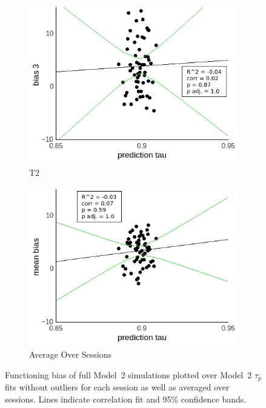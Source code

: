 \documentclass[a4paper]{scrreprt}
\begin{document}
\begin{figure}
\begin{subfigure}[b]{0.49\textwidth}
        \includegraphics[width=\textwidth]{figs/sec3/pred/predno_diff_3_mod2mod2.jpeg}
        \caption{T2}
    \end{subfigure}
    \begin{subfigure}[b]{0.49\textwidth}
        \includegraphics[width=\textwidth]{figs/sec3/pred/predno_diff_mean_mod2mod2.jpeg}
        \caption{Average Over Sessions}
    \end{subfigure}
\caption{Functioning bias of full Model~2 simulations plotted over Model~2 $\tau_p$ fits without outliers for each session as well as averaged over sessions. Lines indicate correlation fit and 95\% confidence bands.}
\label{fig:predno_diff_mod2mod2}
\end{figure}
\end{document}
